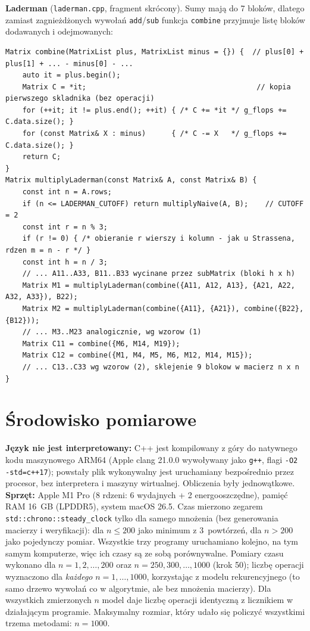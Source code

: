 \documentclass[10pt,a4paper]{article}
\begin{document}
\textbf{Laderman} (\texttt{laderman.cpp}, fragment skrócony). Sumy mają do 7 bloków, dlatego zamiast
zagnieżdżonych wywołań \texttt{add}/\texttt{sub} funkcja \texttt{combine} przyjmuje listę bloków dodawanych
i odejmowanych:
\begin{lstlisting}
Matrix combine(MatrixList plus, MatrixList minus = {}) {  // plus[0] + plus[1] + ... - minus[0] - ...
    auto it = plus.begin();
    Matrix C = *it;                                        // kopia pierwszego skladnika (bez operacji)
    for (++it; it != plus.end(); ++it) { /* C += *it */ g_flops += C.data.size(); }
    for (const Matrix& X : minus)      { /* C -= X   */ g_flops += C.data.size(); }
    return C;
}
Matrix multiplyLaderman(const Matrix& A, const Matrix& B) {
    const int n = A.rows;
    if (n <= LADERMAN_CUTOFF) return multiplyNaive(A, B);    // CUTOFF = 2
    const int r = n % 3;
    if (r != 0) { /* obieranie r wierszy i kolumn - jak u Strassena, rdzen m = n - r */ }
    const int h = n / 3;
    // ... A11..A33, B11..B33 wycinane przez subMatrix (bloki h x h)
    Matrix M1 = multiplyLaderman(combine({A11, A12, A13}, {A21, A22, A32, A33}), B22);
    Matrix M2 = multiplyLaderman(combine({A11}, {A21}), combine({B22}, {B12}));
    // ... M3..M23 analogicznie, wg wzorow (1)
    Matrix C11 = combine({M6, M14, M19});
    Matrix C12 = combine({M1, M4, M5, M6, M12, M14, M15});
    // ... C13..C33 wg wzorow (2), sklejenie 9 blokow w macierz n x n
}
\end{lstlisting}

\section{Środowisko pomiarowe}
\textbf{Język nie jest interpretowany:} C++ jest kompilowany z góry do natywnego kodu maszynowego ARM64
(Apple clang 21.0.0 wywoływany jako \texttt{g++}, flagi \texttt{-O2 -std=c++17}); powstały plik wykonywalny jest
uruchamiany bezpośrednio przez procesor, bez interpretera i maszyny wirtualnej. Obliczenia były jednowątkowe.
\textbf{Sprzęt:} Apple M1 Pro (8 rdzeni: 6 wydajnych + 2 energooszczędne), pamięć RAM 16~GB (LPDDR5),
system macOS 26.5. Czas mierzono zegarem \texttt{std::chrono::steady\_clock}
tylko dla samego mnożenia (bez generowania macierzy i weryfikacji): dla $n\le200$ jako minimum z 3~powtórzeń,
dla $n>200$ jako pojedynczy pomiar. Wszystkie trzy programy uruchamiano kolejno, na tym samym komputerze, więc ich
czasy są ze sobą porównywalne. Pomiary czasu wykonano dla $n=1,2,\dots,200$ oraz $n=250,300,\dots,1000$ (krok 50);
liczbę operacji wyznaczono dla \emph{każdego} $n=1,\dots,1000$, korzystając z modelu rekurencyjnego (to samo drzewo
wywołań co w algorytmie, ale bez mnożenia macierzy). Dla wszystkich zmierzonych $n$ model daje liczbę operacji
identyczną z licznikiem w działającym programie. Maksymalny rozmiar, który udało się policzyć wszystkimi trzema
metodami: $n=1000$.
\end{document}
